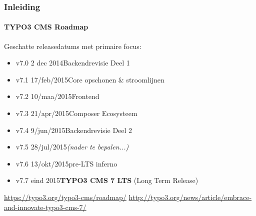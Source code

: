 
\begin{frame}[fragile]
	\frametitle{Inleiding}
	\framesubtitle{TYPO3 CMS Roadmap}

	Geschatte releasedatums met primaire focus:

	\begin{itemize}
		\item v7.0 \textrightarrow\tabto{1.3cm}2 dec 2014\tabto{3.4cm}Backendrevisie Deel 1

		\item
			\begingroup
				\color{typo3orange}
					v7.1 \textrightarrow\tabto{1.3cm}17/feb/2015\tabto{3.4cm}Core opschonen \& stroomlijnen
			\endgroup

		\item v7.2 \textrightarrow\tabto{1.3cm}10/maa/2015\tabto{3.4cm}Frontend
		\item v7.3 \textrightarrow\tabto{1.3cm}21/apr/2015\tabto{3.4cm}Composer Ecosysteem
		\item v7.4 \textrightarrow\tabto{1.3cm}9/jun/2015\tabto{3.4cm}Backendrevisie Deel 2
		\item v7.5 \textrightarrow\tabto{1.3cm}28/jul/2015\tabto{3.4cm}\textit{(nader te bepalen...)}
		\item v7.6 \textrightarrow\tabto{1.3cm}13/okt/2015\tabto{3.4cm}pre-LTS inferno
		\item v7.7 \textrightarrow\tabto{1.3cm}eind 2015\tabto{3.4cm}\textbf{TYPO3 CMS 7 LTS} (Long Term Release)
	\end{itemize}

	\smaller
		\url{https://typo3.org/typo3-cms/roadmap/}\newline
		\url{http://typo3.org/news/article/embrace-and-innovate-typo3-cms-7/}
	\normalsize

\end{frame}



